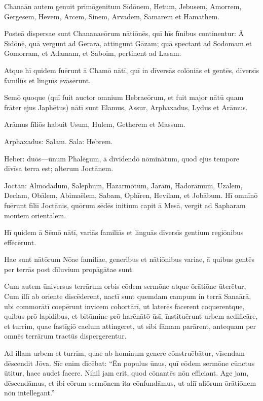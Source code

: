 \Versus Chanaān autem genuit prīmōgenitum Sīdōnem, Hetum,
\Versus Jebusem, Amorrem, Gergesem,
\Versus Hevem, Arcem, Sinem,
\Versus Arvadem, Samarem et Hamathem.

Posteā dispersae sunt Chananaeōrum nātiōnēs,
\Versus quī hīs fīnibus continentur: Ā Sidōnē, quā vergunt ad Gerara, attingunt Gāzam; quā spectant ad Sodomam et Gomorram, et Adamam, et Saboim, pertinent ad Lasam.

\Versus Atque hī quidem fuērunt ā Chamō nātī, quī in dīversās colōniās et gentēs, dīversīs familiīs et linguīs ēvāsērunt.

\Versus Semō quoque (quī fuit auctor omnium Hebraeōrum, et fuit major nātū quam frāter ejus Japhētus)
\Versus nātī sunt Elamus, Assur, Arphaxadus, Lydus et Arāmus.

\Versus Arāmus fīliōs habuit Usum, Hulem, Getherem et Massum.

\Versus Arphaxadus: Salam. Sala: Hebrem.
	
\Versus Heber: duōs—ūnum Phalēgum, ā dīvidendō nōminātum, quod ejus tempore dīvīsa terra est; alterum Joctānem.

\Versus Joctān: Almodādum, Salephum, Hazarmōtum, Jaram,
\Versus Hadorāmum, Uzālem, Declam,
\Versus Obālem, Abimaēlem, Sabam, Ophīren, Hevilam, et Jobābum. Hī omnīnō fuērunt fīliī Joctānis,
\Versus quōrum sēdēs initium capit ā Mesā, vergit ad Sapharam montem orientālem.

\Versus Hī quidem ā Sēmō nātī, variās familiās et linguās dīversīs gentium regiōnibus effēcērunt.

\Versus Hae sunt nātōrum Nōae familiae, generibus et nātiōnibus variae, ā quibus gentēs per terrās post dīluvium propāgātae sunt.



\Caput
\Versus Cum autem ūniversus terrārum orbis eōdem sermōne atque ōrātiōne ūterētur,
\Versus Cum illī ab oriente discēderent, nactī sunt quemdam campum in terrā Sanaārā, ubi commorātī
\Versus coepērunt invicem cohortārī, ut laterēs facerent coquerentque, quibus prō lapidibus, et bitūmine prō harēnātō ūsī,
\Versus īnstituērunt urbem aedificāre, et turrim, quae fastīgiō caelum attingeret, ut sibi fāmam parārent, antequam per omnēs terrārum tractūs dispergerentur.

\Versus Ad illam urbem et turrim, quae ab hominum genere cōnstruēbātur, vīsendam dēscendit Jōva.
\Versus Sīc enim dīcēbat: ``Ēn populus ūnus, quī eōdem sermōne cūnctus ūtitur, haec audet facere. Nihil jam erit, quod cōnantēs nōn efficiant.
\Versus Age jam, dēscendāmus, et ibi eōrum sermōnem ita cōnfundāmus, ut aliī aliōrum ōrātiōnem nōn intellegant.''

